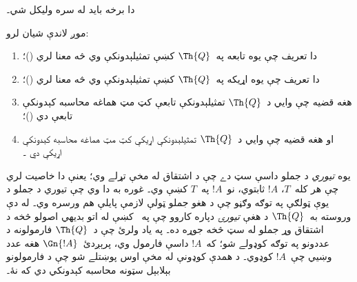 \documentclass[../../../include/open-logic-section]{subfiles}
\begin{document}


\begin{editorial}
دا برخه بايد له سره وليکل شي۔
\end{editorial}

موږ لاندې شيان لرو:
\begin{enumerate}
\item دا تعريف چې يوه تابعه په~$\Th{Q}$ کښې تمثيلېدونکې وي څه معنا
  لري ()؛
\item دا تعريف چې يوه اړيکه په~$\Th{Q}$ کښې تمثيلېدونکې وي څه معنا
  لري ()؛
\item هغه قضيه چې وايي د~$\Th{Q}$ تمثيلېدونکې تابعې کټ مټ هماغه
  محاسبه کېدونکې تابعې دي
  ()؛
\item او هغه قضيه چې وايي د~$\Th{Q}$ تمثيلېدونکې اړيکې کټ مټ هماغه
  محاسبه کېدونکې اړيکې دي
  ۔
\end{enumerate}

يوه \emph{تيوري} د جملو داسې سټ دے چې د اشتقاق له مخې تړلے وي؛
يعنې دا خاصيت لري چې هر کله~$T$، $!A$ ثابتوي، نو~$!A$ په~$T$ کښې
وي۔ غوره به دا وي چې تيوري د جملو د يوې ټولګې په توګه وګڼو چې د
هغو جملو ټولې لازمې پايلې هم ورسره وي۔ له دې وروسته به~$\Th{Q}$ د
هغې \emph{تيورۍ} دپاره کاروو چې په~ کښې له
اتو بديهي اصولو څخه د اشتقاق وړ جملو له سټ څخه جوړه ده۔ په ياد ولرئ
چې د~$\Th{Q}$ فارمولونه د عددونو په توګه کوډولے شو؛ که~$!A$ داسې
فارمول وي، پرېږدئ~$\Gn{!A}$ هغه عدد وښيي چې~$!A$ کوډوي۔ د همدې
کوډونې له مخې اوس پوښتلے شو چې د فارمولونو بېلابېل سټونه محاسبه
کېدونکي دي که نۀ۔
\end{document}

